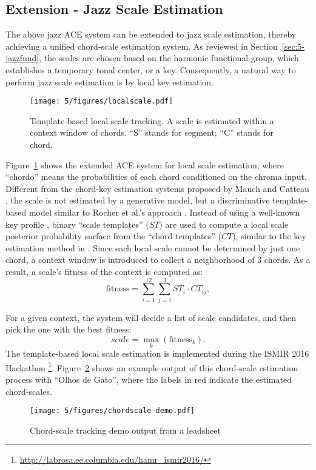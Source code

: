 \subsection{Extension - Jazz Scale Estimation}
The above jazz ACE system can be extended to jazz scale estimation, thereby achieving a unified chord-scale estimation system. As reviewed in Section~\ref{sec:5-jazzfund}, the scales are chosen based on the harmonic functional group, which establishes a temporary tonal center, or a key. Consequently, a natural way to perform jazz scale estimation is by local key estimation.
\begin{figure}[htb]
    \centering
        \texttt{[image: 5/figures/localscale.pdf]}
    \caption{Template-based local scale tracking. A scale is estimated within a context window of chords. ``S'' stands for segment; ``C'' stands for chord.}
    \label{fig:5-localscale}
\end{figure}
Figure~\ref{fig:5-localscale} shows the extended ACE system for local scale estimation, where ``chordo'' means the probabilities of each chord conditioned on the chroma input. Different from the chord-key estimation systems proposed by Mauch \cite{mauch2010simultaneous} and Catteau \cite{catteau2007probabilistic}, the scale is not estimated by a generative model, but a discriminative template-based model similar to Rocher et al.'s approach \cite{rocher2010concurrent}. Instead of using a well-known key profile \cite{temperley2004cognition}, binary ``scale templates'' ($ST$) are used to compute a local scale posterior probability surface from the ``chord templates'' ($CT$), similar to the key estimation method in \cite{hu2015safedj}. Since each local scale cannot be determined by just one chord, a context window is introduced to collect a neighborhood of 3 chords. As a result, a scale's fitness of the context is computed as:
\begin{equation}
\text{fitness} = \sum_{i=1}^{12} \sum_{j=1}^3 {ST_i\cdot CT_{ij}},
\end{equation}

For a given context, the system will decide a list of scale candidates, and then pick the one with the best fitness:
\begin{equation}
scale = \max_k (\text{fitness}_k).
\end{equation}
The template-based local scale estimation is implemented during the ISMIR 2016 Hackathon \footnote{\url{http://labrosa.ee.columbia.edu/hamr\_ismir2016/}}. Figure~\ref{fig:5-chordscale} shows an example output of this chord-scale estimation process with ``Olhos de Gato'', where the labels in red indicate the estimated chord-scales.
\begin{figure}[htbp]
    \centering
        \texttt{[image: 5/figures/chordscale-demo.pdf]}
    \caption{Chord-scale tracking demo output from a leadsheet}
    \label{fig:5-chordscale}
\end{figure}

